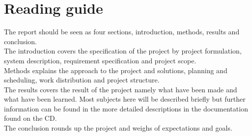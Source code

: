 \section{Reading guide}
The report should be seen as four sections, introduction, methods, results and conclusion.\\
The introduction covers the specification of the project by project formulation, system description, requirement specification and project scope.\\
Methods explains the approach to the project and solutions, planning and scheduling, work distribution and project structure.\\
The results covers the result of the project namely what have been made and what have been learned. Most subjects here will be described briefly but further information can be found in the more detailed descriptions in the documentation found on the CD.\\
The conclusion rounds up the project and weighs of expectations and goals.

